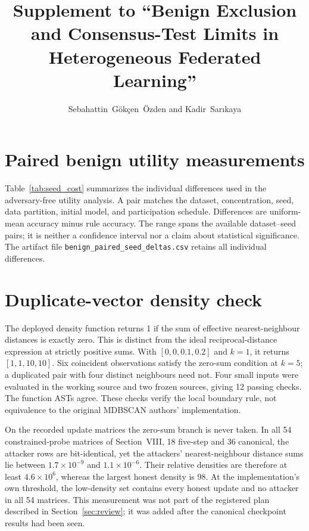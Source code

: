 \documentclass[journal]{IEEEtran}
\begin{document}
\title{Supplement to ``Benign Exclusion and Consensus-Test Limits in Heterogeneous Federated Learning''}
\author{Sebahattin~G\"ok\c{c}en~\"Ozden and Kadir~Sar{\i}kaya}
\maketitle
\section{Paired benign utility measurements}
Table~\ref{tab:seed_cost} summarizes the individual differences used in the adversary-free utility analysis. A pair matches the dataset, concentration, seed, data partition, initial model, and participation schedule. Differences are uniform-mean accuracy minus rule accuracy. The range spans the available dataset--seed pairs; it is neither a confidence interval nor a claim about statistical significance. The artifact file \texttt{benign\_paired\_seed\_deltas.csv} retains all individual differences.


\section{Duplicate-vector density check}
The deployed density function returns 1 if the sum of effective nearest-neighbour distances is exactly zero. This is distinct from the ideal reciprocal-distance expression at strictly positive sums. With $[0,0,0.1,0.2]$ and $k=1$, it returns $[1,1,10,10]$. Six coincident observations satisfy the zero-sum condition at $k=5$; a duplicated pair with four distinct neighbours need not. Four small inputs were evaluated in the working source and two frozen sources, giving 12 passing checks. The function ASTs agree. These checks verify the local boundary rule, not equivalence to the original MDBSCAN authors' implementation.

On the recorded update matrices the zero-sum branch is never taken. In all 54 constrained-probe matrices of Section~VIII, 18 five-step and 36 canonical, the attacker rows are bit-identical, yet the attackers' nearest-neighbour distance sums lie between $1.7\times10^{-9}$ and $1.1\times10^{-6}$. Their relative densities are therefore at least $4.6\times10^{6}$, whereas the largest honest density is 98. At the implementation's own threshold, the low-density set contains every honest update and no attacker in all 54 matrices. This measurement was not part of the registered plan described in Section~\ref{sec:review}; it was added after the canonical checkpoint results had been seen.
\end{document}
